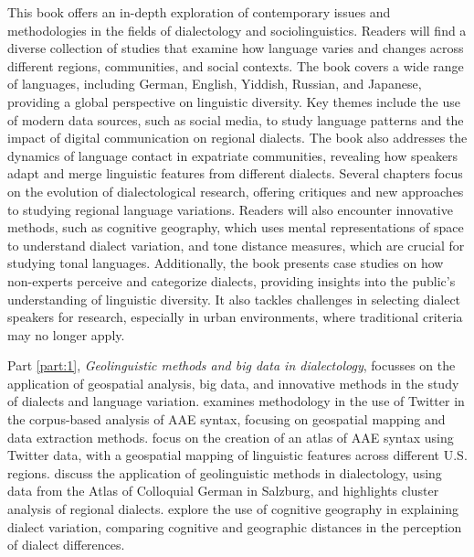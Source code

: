 \begin{refsection}
This book offers an in-depth exploration of contemporary issues and methodologies in the fields of dialectology and sociolinguistics. Readers will find a diverse collection of studies that examine how language varies and changes across different regions, communities, and social contexts. The book covers a wide range of languages, including German, English, Yiddish, Russian, and Japanese, providing a global perspective on linguistic diversity.
Key themes include the use of modern data sources, such as social media, to study language patterns and the impact of digital communication on regional dialects. The book also addresses the dynamics of language contact in expatriate communities, revealing how speakers adapt and merge linguistic features from different dialects. Several chapters focus on the evolution of dialectological research, offering critiques and new approaches to studying regional language variations. Readers will also encounter innovative methods, such as cognitive geography, which uses mental representations of space to understand dialect variation, and tone distance measures, which are crucial for studying tonal languages.
Additionally, the book presents case studies on how non-experts perceive and categorize dialects, providing insights into the public's understanding of linguistic diversity. It also tackles challenges in selecting dialect speakers for research, especially in urban environments, where traditional criteria may no longer apply.

Part \ref{part:1}, \emph{Geolinguistic methods and big data in dialectology}, focusses on the application of geospatial analysis, big data, and innovative methods in the study of dialects and language variation.
\citeauthor{chapters/01-baxter} examines methodology in the use of Twitter in the corpus-based analysis of AAE syntax, focusing on geospatial mapping and data extraction methods. \citeauthor{chapters/02-baxterEtAl} focus on the creation of an atlas of AAE syntax using Twitter data, with a geospatial mapping of linguistic features across different U.S. regions. \citeauthor{chapters/03-blassnigg} discuss the application of geolinguistic methods in dialectology, using data from the Atlas of Colloquial German in Salzburg, and highlights cluster analysis of regional dialects. \citeauthor{chapters/04-sekeres} explore the use of cognitive geography in explaining dialect variation, comparing cognitive and geographic distances in the perception of dialect differences.


\end{refsection}
